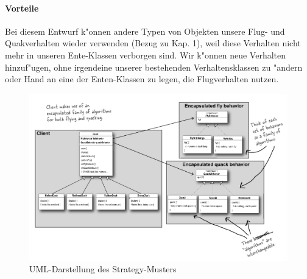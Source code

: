 \paragraph{Vorteile}
Bei  diesem  Entwurf  k"onnen  andere Typen  von  Objekten unsere  Flug- und  Quakverhalten  wieder
verwenden (Bezug zu Kap. 1), weil diese Verhalten nicht mehr in unseren Ente-Klassen verborgen sind.
Wir  k"onnen  neue Verhalten hinzuf"ugen, ohne  irgendeine unserer bestehenden  Verhaltensklassen zu
"andern oder Hand an eine der Enten-Klassen zu legen, die Flugverhalten nutzen. 

\begin{figure}
	\centering
	\includegraphics[width=\linewidth]{strategy/img/strategyUML}
	\caption{UML-Darstellung des Strategy-Musters}
	\label{fig:strategyUML}
\end{figure}